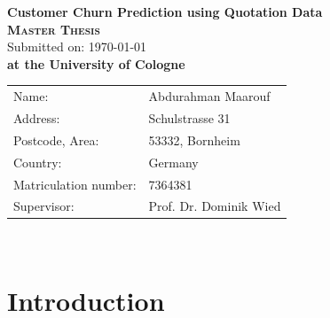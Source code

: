 \documentclass[12pt,titlepage]{article}
\begin{document}
\thispagestyle{empty}

\begin{titlepage}\centering
    \begin{center}
        \vspace*{\fill}
        \huge \textbf{\textsf{Customer Churn Prediction using Quotation Data}}\\
        \vspace{2cm}
        \LARGE\textbf{\textsc{Master Thesis}}\\
        \vspace{1cm}
        \normalsize
        Submitted on: \today \\
        \vspace{2.5cm}
        \large \textbf{at the University of Cologne}
        \vspace{3cm}
    \end{center}
    \normalsize{
        \begin{tabular}{ll}
            Name: & {Abdurahman Maarouf} \\
            Address: & {Schulstrasse 31} \\
            Postcode, Area: & {53332, Bornheim} \\
            Country: & {Germany} \\
            Matriculation number: & {7364381} \\
            Supervisor: & {Prof. Dr. Dominik Wied} \\
        \end{tabular}\\
    }
    \vspace*{\fill}

\end{titlepage}

\thispagestyle{empty}

\tableofcontents

\newpage


\setcounter{page}{1}

\section{Introduction} \par
\end{document}
